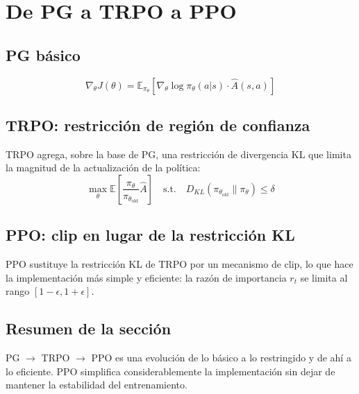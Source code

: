\section{De PG a TRPO a PPO}
\subsection{PG básico}
$$\nabla_\theta J(\theta) = \mathbb{E}_{\pi_\theta}\left[\nabla_\theta \log \pi_\theta(a|s) \cdot \hat{A}(s,a)\right]$$

\subsection{TRPO: restricción de región de confianza}
TRPO agrega, sobre la base de PG, una restricción de divergencia KL que limita la magnitud de la actualización de la política:
$$\max_\theta \mathbb{E}\left[\frac{\pi_\theta}{\pi_{\theta_\text{old}}} \hat{A}\right] \quad \text{s.t.} \quad D_{KL}(\pi_{\theta_\text{old}} \| \pi_\theta) \le \delta$$

\subsection{PPO: clip en lugar de la restricción KL}
PPO sustituye la restricción KL de TRPO por un mecanismo de clip, lo que hace la implementación más simple y eficiente: la razón de importancia $r_t$ se limita al rango $[1{-}\epsilon, 1{+}\epsilon]$.

\subsection{Resumen de la sección}
PG $\to$ TRPO $\to$ PPO es una evolución de lo básico a lo restringido y de ahí a lo eficiente. PPO simplifica considerablemente la implementación sin dejar de mantener la estabilidad del entrenamiento.

